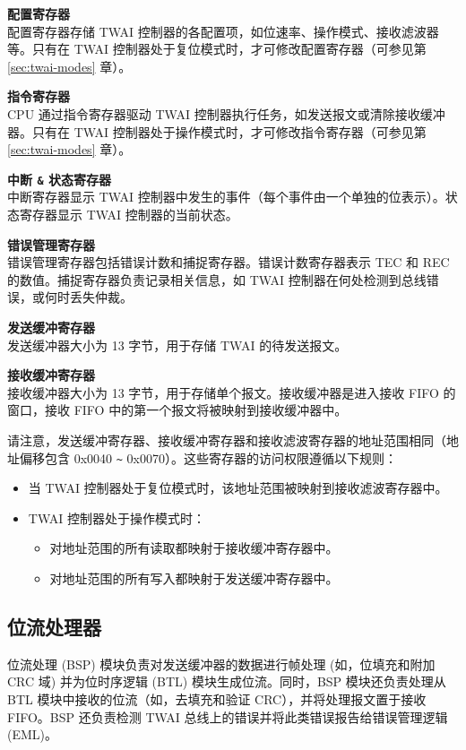 \documentclass[main\_\_CN.tex]{subfiles}
\begin{document}
{\bfseries 配置寄存器}\\
配置寄存器存储 TWAI 控制器的各配置项，如位速率、操作模式、接收滤波器等。只有在 TWAI 控制器处于复位模式时，才可修改配置寄存器（可参见第 \ref{sec:twai-modes} 章）。

{\bfseries 指令寄存器}\\
CPU 通过指令寄存器驱动 TWAI 控制器执行任务，如发送报文或清除接收缓冲器。只有在 TWAI 控制器处于操作模式时，才可修改指令寄存器（可参见第 \ref{sec:twai-modes} 章）。

{\bfseries 中断 \verb+&+ 状态寄存器}\\
中断寄存器显示 TWAI 控制器中发生的事件（每个事件由一个单独的位表示）。状态寄存器显示 TWAI 控制器的当前状态。

{\bfseries 错误管理寄存器}\\
错误管理寄存器包括错误计数和捕捉寄存器。错误计数寄存器表示 TEC 和 REC 的数值。捕捉寄存器负责记录相关信息，如 TWAI 控制器在何处检测到总线错误，或何时丢失仲裁。

{\bfseries 发送缓冲寄存器}\\
发送缓冲器大小为 13 字节，用于存储 TWAI 的待发送报文。

{\bfseries 接收缓冲寄存器}\\
接收缓冲器大小为 13 字节，用于存储单个报文。接收缓冲器是进入接收 FIFO 的窗口，接收 FIFO 中的第一个报文将被映射到接收缓冲器中。

请注意，发送缓冲寄存器、接收缓冲寄存器和接收滤波寄存器的地址范围相同（地址偏移包含 0x{}0040 \verb+~+ 0x{}0070）。这些寄存器的访问权限遵循以下规则：

\begin{itemize}
    \item 当 TWAI 控制器处于复位模式时，该地址范围被映射到接收滤波寄存器中。
    \item TWAI 控制器处于操作模式时：
    \begin{itemize}
        \item 对地址范围的所有读取都映射于接收缓冲寄存器中。
        \item 对地址范围的所有写入都映射于发送缓冲寄存器中。
    \end{itemize}
\end{itemize}

\subsection{位流处理器}
位流处理 (BSP) 模块负责对发送缓冲器的数据进行帧处理 (如，位填充和附加 CRC 域) 并为位时序逻辑 (BTL) 模块生成位流。同时，BSP 模块还负责处理从 BTL 模块中接收的位流（如，去填充和验证 CRC），并将处理报文置于接收 FIFO。BSP 还负责检测 TWAI 总线上的错误并将此类错误报告给错误管理逻辑 (EML)。
\end{document}
